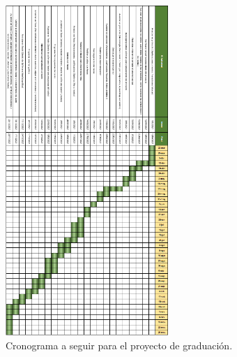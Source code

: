 \begin{figure}[h]
    \centering
    \includegraphics[width=0.55\textwidth]{cronograma.png}
    \caption{Cronograma a seguir para el proyecto de graduación.}
    \label{fig:mesh1}
\end{figure}